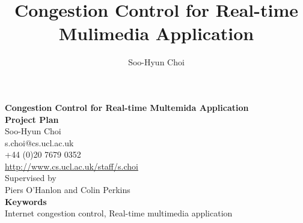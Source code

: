 \documentclass[a4paper,10pt]{article}
\title{Congestion Control for Real-time Mulimedia Application}
\author{Soo-Hyun Choi}
\begin{document}
\begin{titlepage}
\begin{center}
{\LARGE \textsf{\textbf{Congestion Control for Real-time Multemida Application 
\\}}}
\vspace{.5cm}
{\large \textsf{\textbf{Project Plan}}\\}
\vspace{1cm}
{\large \textsf{Soo-Hyun Choi\\}}
{\small \textsf{s.choi@cs.ucl.ac.uk}\\}
{\small \textsf{+44 (0)20 7679 0352}\\}
{\small \url{http://www.cs.ucl.ac.uk/staff/s.choi}\\}
\vspace{2.5cm}
{\large \textsf{Supervised by \\
Piers O'Hanlon and Colin Perkins \\}}
\vspace{2.0cm}
{\normalsize \textbf{Keywords}\\Internet congestion control, Real-time
multimedia application}
\end{center}


\end{titlepage}
\end{document}
